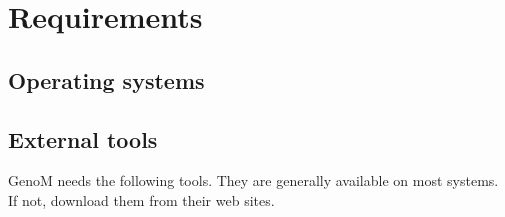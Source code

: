 %
%
%
%
%
%
%


\section{Requirements}
\label{sec|configuration|requirements}

\subsection{Operating systems}


\subsection{External tools}

GenoM needs the following tools.
They are generally available on most systems. If not, download
them from their web sites. 

